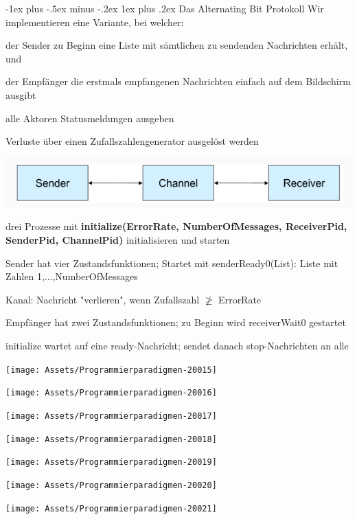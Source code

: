 \documentclass[10pt]{article}
\makeatletter
\renewcommand{\subsubsection}{\@startsection{subsubsection}{3}{0mm}%
                                {-1ex plus -.5ex minus -.2ex}%
                                {1ex plus .2ex}%
                                {\normalfont\small\bfseries}}
\makeatother
\begin{document}
  \subsubsection{Das Alternating Bit Protokoll}
  Wir implementieren eine Variante, bei welcher: 
  \begin{itemize*}
    \item der Sender zu Beginn eine Liste mit sämtlichen zu sendenden Nachrichten erhält, und
    \item der Empfänger die erstmals empfangenen Nachrichten einfach auf dem Bildschirm ausgibt
    \item alle Aktoren Statusmeldungen ausgeben
    \item Verluste über einen Zufallszahlengenerator ausgelöst werden
  \end{itemize*}
  \begin{center}
    \centering
    \includegraphics[width=0.7\linewidth]{Assets/Programmierparadigmen-alternate-bit-protokoll.png}
  \end{center}
  drei Prozesse mit \textbf{initialize(ErrorRate, NumberOfMessages, ReceiverPid, SenderPid, ChannelPid)} initialisieren und starten
  \begin{itemize*}
    \item Sender hat vier Zustandsfunktionen; Startet mit senderReady0(List): Liste mit Zahlen 1,...,NumberOfMessages
    \item Kanal: Nachricht "verlieren", wenn Zufallszahl $\ngeq$ ErrorRate
    \item Empfänger hat zwei Zustandsfunktionen; zu Beginn wird receiverWait0 gestartet
    \item initialize wartet auf eine ready-Nachricht; sendet danach stop-Nachrichten an alle
  \end{itemize*}
  \begin{center}
    \centering
    \texttt{[image: Assets/Programmierparadigmen-20015]}
  \end{center}
  \begin{center}
    \centering
    \texttt{[image: Assets/Programmierparadigmen-20016]}
  \end{center}
  \begin{center}
    \centering
    \texttt{[image: Assets/Programmierparadigmen-20017]}
  \end{center}
  \begin{center}
    \centering
    \texttt{[image: Assets/Programmierparadigmen-20018]}
  \end{center}
  \begin{center}
    \centering
    \texttt{[image: Assets/Programmierparadigmen-20019]}
  \end{center}
  \begin{center}
    \centering
    \texttt{[image: Assets/Programmierparadigmen-20020]}
  \end{center}
  \begin{center}
    \centering
    \texttt{[image: Assets/Programmierparadigmen-20021]}
  \end{center}
  
\end{document}
